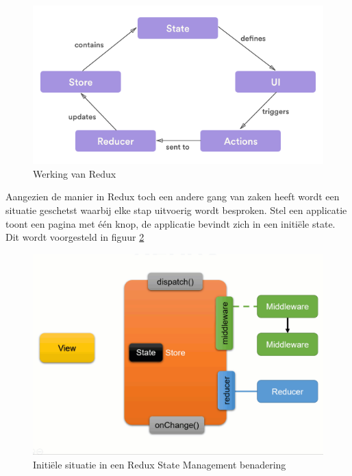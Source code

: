 \begin{figure}[H]
    \centering
    \includegraphics[width=\linewidth]{img/stand-van-zaken/redux-working.png}
    \caption{Werking van Redux \autocite{Tahir2018}}
    \label{fig:redux-working}
\end{figure}

Aangezien de manier in Redux toch een andere gang van zaken heeft wordt een situatie geschetst waarbij elke stap uitvoerig wordt besproken.
Stel een applicatie toont een pagina met één knop, de applicatie bevindt zich in een initiële state. Dit wordt voorgesteld in figuur \ref{fig:redux-working-detailed-1}

\begin{figure}[H]
    \centering
    \includegraphics[width=\figureWidthModifier\linewidth]{img/stand-van-zaken/redux-working-detailed-1.png}
    \caption{Initiële situatie in een Redux State Management benadering \textcite{Boelens2019}}
    \label{fig:redux-working-detailed-1}
\end{figure}

